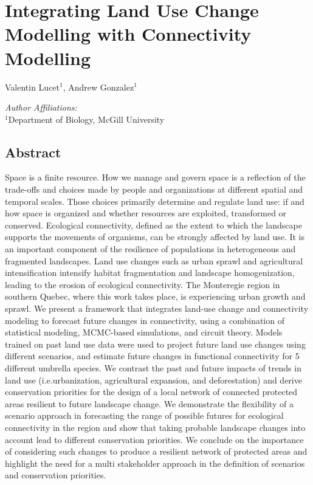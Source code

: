 \chapter{Integrating Land Use Change Modelling with Connectivity Modelling}
\begin{center}
{Valentin Lucet$^{1}$, Andrew Gonzalez$^{1}$}\\
\end{center}
\textit{Author Affiliations:}\\
\normalsize{$^{1}$Department of Biology, McGill University}\\
\section{Abstract}

Space is a finite resource. How we manage and govern space is a reflection of the trade-offs and choices made by people and organizations at different spatial and temporal scales. Those choices primarily determine and regulate land use: if and how space is organized and whether resources are exploited, transformed or conserved. Ecological connectivity, defined as the extent to which the landscape supports the movements of organisms, can be strongly affected by land use. It is an important component of the resilience of populations in heterogeneous and fragmented landscapes. Land use changes such as urban sprawl and agricultural intensification intensify habitat fragmentation and landscape homogenization, leading to the erosion of ecological connectivity. The Monteregie region in southern Quebec, where this work takes place, is experiencing urban growth and sprawl. We present a framework that integrates land-use change and connectivity modeling to forecast future changes in connectivity, using a combination of statistical modeling, MCMC-based simulations, and circuit theory. Models trained on past land use data were used to project future land use changes using different scenarios, and estimate future changes in functional connectivity for 5 different umbrella species. We contrast the past and future impacts of trends in land use (i.e.urbanization, agricultural expansion, and deforestation) and derive conservation priorities for the design of a local network of connected protected areas resilient to future landscape change. We demonstrate the flexibility of a scenario approach in forecasting the range of possible futures for ecological connectivity in the region and show that taking probable landscape changes into account lead to different conservation priorities. We conclude on the importance of considering such changes to produce a resilient network of protected areas and highlight the need for a multi stakeholder approach in the definition of scenarios and conservation priorities.

